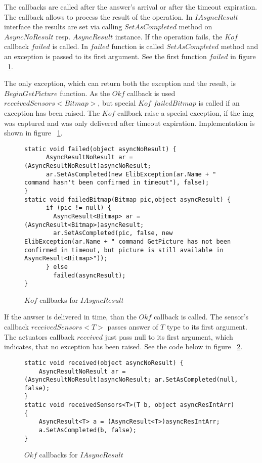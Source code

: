 	The callbacks are called after the answer's arrival or after the timeout expiration.
	The callback allows to process the result of the operation.
	In $IAsyncResult$ interface the results are set via calling $SetAsCompleted$ method 
	on $AsyncNoResult$ resp. $AsyncResult$ instance.
	If the operation fails, the $Kof$ callback $failed$ is called. 
	In $failed$ function is called $SetAsCompleted$ method and an exception is passed to its first argument.
	See the first function $failed$ in figure ~\ref{Ikofs}.

	The only exception, which can return both the exception and the result, is $BeginGetPicture$ function.
	As the $Okf$ callback is used $receivedSensors<Bitmap>$, but special $Kof$ $failedBitmap$ 
	is called if an exception has been raised.
	The $Kof$ callback raise a special exception, if the img was captured and was only 
	delivered after timeout expiration.
	Implementation is shown in figure ~\ref{Ikofs}. 

	
\begin{figure}[!hbp]
\begin{lstlisting}
static void failed(object asyncNoResult) {
      AsyncResultNoResult ar = (AsyncResultNoResult)asyncNoResult;
      ar.SetAsCompleted(new ElibException(ar.Name + " command hasn't been confirmed in timeout"), false); 
}
static void failedBitmap(Bitmap pic,object asyncResult) {
      if (pic != null) {
        AsyncResult<Bitmap> ar = (AsyncResult<Bitmap>)asyncResult;        
        ar.SetAsCompleted(pic, false, new ElibException(ar.Name + " command GetPicture has not been confirmed in timeout, but picture is still available in AsyncResult<Bitmap>"));
      } else
        failed(asyncResult);
}
\end{lstlisting}	
\caption{$Kof$ callbacks for $IAsyncResult$} \label{Ikofs}
\end{figure}


	If the anwser is delivered in time, than the $Okf$ callback is called.
	The sensor's callback $receivedSensors<T>$ passes answer of $T$ type to its first argument.
	The actuators callback $received$ just pass null to its first argument, which indicates,
	that no exception has been raised.
	See the code below in figure ~\ref{Iokfs}.


\begin{figure}[!hbp]
\begin{lstlisting}
static void received(object asyncNoResult) {
	AsyncResultNoResult ar = (AsyncResultNoResult)asyncNoResult; ar.SetAsCompleted(null, false); 
}
static void receivedSensors<T>(T b, object asyncResIntArr) {
	AsyncResult<T> a = (AsyncResult<T>)asyncResIntArr;
	a.SetAsCompleted(b, false);
}
\end{lstlisting}	
\caption{$Okf$ callbacks for $IAsyncResult$} \label{Iokfs}
\end{figure}

